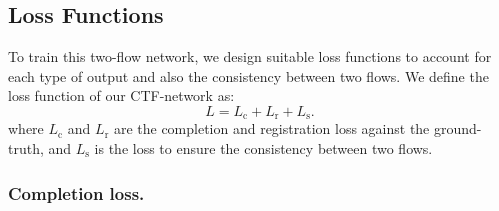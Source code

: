 \subsection{Loss Functions}
To train this two-flow network, we design suitable loss functions to account for each type of output and also the consistency between two flows. We define the loss function of our CTF-network as:
\begin{equation}
L = L_{\text{c}} + L_{\text{r}} + L_{\text{s}}.
\end{equation}
where $L_{\text{c}}$ and $L_{\text{r}}$ are the completion and registration loss against the ground-truth, and $L_{\text{s}}$ is the loss to ensure the consistency between two flows.%

\subsubsection{Completion loss.}

